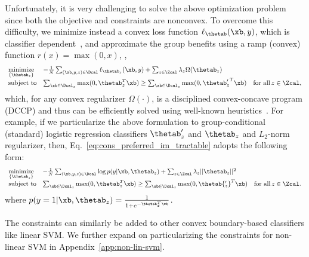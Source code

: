 \documentclass{article}
\begin{document}
Unfortunately, it is very challenging to solve the above optimization problem since
both the objective and constraints are nonconvex.
To overcome this difficulty, we minimize instead a convex loss function $\ell_{\thetab}(\xb, y)$, which is classifier dependent~\cite{bishop2006pattern}, and approximate
the group benefits using a ramp (convex) function $r(x) = \max(0, x)$, \ie,
\begin{equation}\label{eq:cons_preferred_im_tractable}
	\begin{array}{ll}
	\underset{\{\thetab_z\}}{\mbox{minimize}} & -\frac{1}{N} \sum_{(\xb, y, z) \in \Dcal} \ell_{\thetab_{z}}(\xb, y) + \sum_{z \in \Zcal} \lambda_z \Omega(\thetab_z) \\
		\mbox{subject to} & \sum_{\xb \in \Dcal_z} \max(0, \thetab_z^{T} \xb) \geq \sum_{\xb \in \Dcal_z} \max(0, {\thetab'_z}^{T} \xb) \quad \mbox{for all} \, z \in \Zcal,
	\end{array}
\end{equation}
which, for any convex regularizer $\Omega(\cdot)$, is a disciplined convex-concave program (DCCP) and thus can be efficiently solved using well-known heuristics~\cite{boyd_concave_convex}.
For example, if we particularize the above formulation to group-conditional (standard) logistic regression classifiers $\thetab'_z$ and $\thetab_z$ and $L_2$-norm regularizer,
then, Eq.~\ref{eq:cons_preferred_im_tractable} adopts the following form:
\begin{equation}\label{eq:cons_preferred_tractable-lr}
	\begin{array}{ll}
	\underset{\{\thetab_z\}}{\mbox{minimize}} & -\frac{1}{N} \sum_{(\xb, y, z) \in \Dcal} \log p(y | \xb, \thetab_{z}) + \sum_{z \in \Zcal} \lambda_z ||\thetab_z||^2 \\
		\mbox{subject to} & \sum_{\xb \in \Dcal_z} \max(0, \thetab_z^{T} \xb) \geq \sum_{\xb \in \Dcal_z} \max(0, \thetab{'_{z}}^{T} \xb) \quad \mbox{for all} \, z \in \Zcal.
	\end{array}
\end{equation}
where $p(y = 1 | \xb, \thetab_z) = \frac{1}{1+e^{-\thetab_z^T \xb}}$.

The constraints can similarly be added to other convex boundary-based classifiers like linear SVM. We further expand on particularizing the constraints for non-linear SVM in Appendix~\ref{app:non-lin-svm}.
\end{document}
